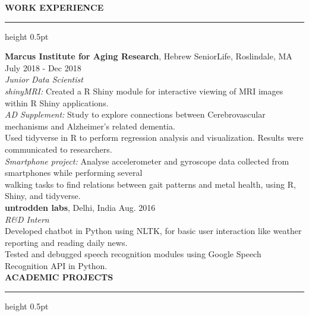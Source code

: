 \documentclass[a4paper]{article}
\newcommand{\myline}{\par
  \kern2pt %
  \hrule height 0.5pt
  \kern2pt %
}
\newcommand{\mybullet}{
	\indent \textbullet \hspace*{2mm}
}
\begin{document}
	\smallskip
	\smallskip
	\noindent
	{\large \textbf{WORK EXPERIENCE}}
	\myline 
	\smallskip
	
  \noindent
  \textbf{Marcus Institute for Aging Research}, Hebrew SeniorLife, Roslindale, MA 
  \hfill July 2018 - Dec 2018\\
        \textit{Junior Data Scientist} \\
        \mybullet \textit{shinyMRI: } Created a R Shiny module for interactive viewing of MRI 
        images within R Shiny applications. \\
				\mybullet \textit{AD Supplement:} Study to explore connections between Cerebrovascular 
				mechanisms and Alzheimer's related dementia. \\ \hspace*{9mm} Used tidyverse in R to 
				perform regression analysis and visualization. Results were communicated to researchers. \\
				\mybullet \textit{Smartphone project:} Analyse accelerometer and gyroscope data collected 
				from smartphones while performing several \\ \hspace*{9mm} walking tasks to find 
				relations between gait patterns and metal health, using R, Shiny, and tidyverse. \\

	\noindent
	\textbf{untrodden labs}, Delhi, India \hfill Aug. 2016 \\
        \textit{R\&D Intern}\\
        \mybullet Developed chatbot in Python using NLTK, for basic user interaction like 
        weather reporting and reading daily news. \\
        \mybullet Tested and debugged speech recognition modules using Google Speech 
        Recognition API in Python. \\
	
	
\noindent
{\large \textbf{ACADEMIC PROJECTS}}
\myline 
\smallskip
\end{document}
